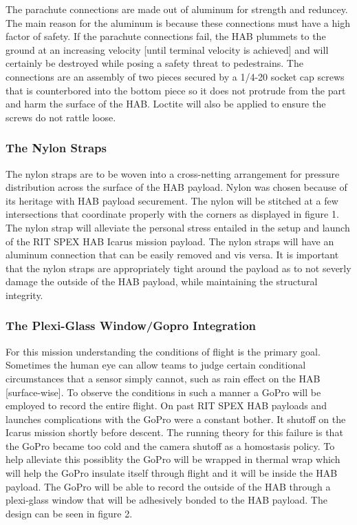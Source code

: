 \documentclass[journal]{SPEXformat}
\begin{document}
  The parachute connections are made out of aluminum for strength and reduncey. The main reason for the aluminum is because these connections
  must have a high factor of safety. If the parachute connections fail, the HAB plummets to the ground at an increasing
  velocity [until terminal velocity is achieved] and will certainly be destroyed while posing a safety threat to
  pedestrains. The connections are an assembly of two pieces secured by a 1/4-20 socket cap screws that is counterbored
  into the bottom piece so it does not protrude from the part and harm the surface of the HAB. Loctite will also be applied
  to ensure the screws do not rattle loose.
\subsubsection{The Nylon Straps}
\label{subsubsec: the nylon straps}

  The nylon straps are to be woven into a cross-netting arrangement for pressure distribution across the surface of the HAB
  payload. Nylon was chosen because of its heritage with HAB payload securement. The nylon will be stitched at a few
  intersections that coordinate properly with the corners as displayed in figure 1. The nylon strap will alleviate the
  personal stress entailed in the setup and launch of the RIT SPEX HAB Icarus mission payload. The nylon straps will have
  an aluminum connection that can be easily removed and vis versa. It is important that the nylon straps are appropriately
  tight around the payload as to not severly damage the outside of the HAB payload, while maintaining the structural
  integrity.
\subsubsection{The Plexi-Glass Window/Gopro Integration}
\label{subsubsec: the plexi-glass window/gopro integration}

  For this mission understanding the conditions of flight is the primary goal. Sometimes the human eye can allow teams
  to judge certain conditional circumstances that a sensor simply cannot, such as rain effect on the HAB [surface-wise].
  To observe the conditions in such a manner a GoPro will be employed to record the entire flight. On past RIT SPEX HAB
  payloads and launches complications with the GoPro were a constant bother. It shutoff on the Icarus mission shortly
  before descent. The running theory for this failure is that the GoPro became too cold and the camera shutoff as a
  homostasis policy. To help alleviate this possiblity the GoPro will be wrapped in thermal wrap which will help the GoPro
  insulate itself through flight and it will be inside the HAB payload. The GoPro will be able to record the outside
  of the HAB through a plexi-glass window that will be adhesively bonded to the HAB payload. The design can be seen in
  figure 2.
\end{document}
